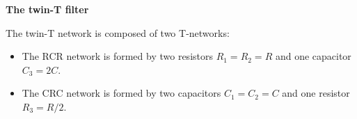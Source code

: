 {\bf The twin-T filter}


The twin-T network is composed of two T-networks: 
\begin{itemize}
\item The RCR network is formed by two resistors $R_1=R_2=R$ and one
  capacitor $C_3=2C$. 

  \begin{comment}
  This T (or Y) network can be converted to a $\pi$ (or $\Delta$) network (see 
  \htmladdnormallink{here}{http://fourier.eng.hmc.edu/e84/lectures/ch2/node3.html}) of three branches:
  \[
  Z'_1=Z'_2=R+\frac{1}{2j\omega C}+\frac{R/2j\omega C}{R}
  =R+\frac{1}{j\omega C}=\frac{j\omega RC+1}{j\omega C}
  \]
  \[
  Z'_3=R+R+\frac{R^2}{1/2j\omega C}=2R+2R^2j\omega C=2R(1+j\omega RC)
  \]
  The frequency response function of the voltage divider formed by 
  $Z'_3$ and $Z'_2$ is:
  \begin{eqnarray}
  H'(j\omega)&=&\frac{Z'_2}{Z'_2+Z'_3}
  =\frac{(1+j\omega RC)/j\omega C}{(1+j\omega RC)/j\omega C+2R(1+j\omega RC)}
  \nonumber\\
  &=&\frac{1}{1+2j\omega RC}=\frac{1}{1+2j\omega\tau}
  \nonumber
  \end{eqnarray}
  where $\tau=RC$. This is a first-order low-pass filter with cut-off
  frequency at $\omega_c=1/2\tau$:
  \[
  |H'(j\omega)|=\left\{\begin{array}{ll}1 & \omega=0\\1/\sqrt{2}& 
  \omega=1/2\tau\\ 0&\omega\rightarrow\infty\end{array}\right.
  \]
  \end{comment}

\item The CRC network is formed by two capacitors $C_1=C_2=C$ and one
  resistor $R_3=R/2$. 


\end{itemize}
